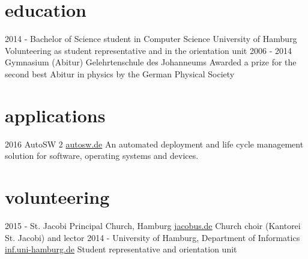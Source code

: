 \documentclass[]{friggeri-cv}
\begin{document}
\section{education}

\begin{entrylist}
  \entry
    {2014 - }
    {Bachelor of Science student {\normalfont in Computer Science}}
    {University of Hamburg}
    {Volunteering as student representative and in the orientation unit}
  \entry
    {2006 - 2014}
    {Gymnasium (Abitur)}
    {Gelehrtenschule des Johanneums}
    {Awarded a prize for the second best Abitur in physics by the German Physical Society}
\end{entrylist}

\section{applications}

\begin{entrylist}
 \entry
    {2016}
    {AutoSW 2}
    {\href{https://www.autosw.de/Demo/Benefit}{autosw.de}}
    {An automated deployment and life cycle management solution for software, operating systems and devices.}
\end{entrylist}

\section{volunteering}

  \begin{entrylist}
    \entry
      {2015 - }
      {St. Jacobi Principal Church, Hamburg}
      {\href{http://www.jacobus.de}{jacobus.de}}
      {Church choir (Kantorei St. Jacobi) and lector}
    \entry
      {2014 - }
      {University of Hamburg, Department of Informatics}
      {\href{https://www.inf.uni-hamburg.de/en.html}{inf.uni-hamburg.de}}
      {Student representative and orientation unit}
  \end{entrylist}
\end{document}
